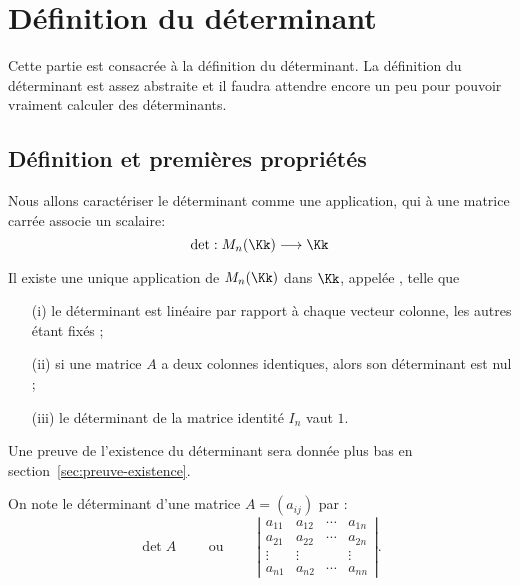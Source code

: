 \documentclass[class=report,crop=false]{standalone}
\begin{document}
\section{Définition du déterminant}

Cette partie est consacrée à la définition du déterminant.
La définition du déterminant est assez abstraite et il faudra attendre encore un peu
pour pouvoir vraiment calculer des déterminants.

\subsection{Définition et premières propriétés}


Nous allons caractériser le déterminant comme une application,
qui à une matrice carrée associe un scalaire:
$$\det : M_n(\Kk) \longrightarrow \Kk$$

\begin{theoreme}
\label{th:def:determinant}
Il existe une unique application de $M_n(\Kk)$ dans $\Kk$,
appelée , telle que
\begin{itemize}
  \item[(i)] le déterminant est linéaire par rapport à chaque
vecteur colonne, les autres étant fixés ;
  \item[(ii)] si une matrice $A$ a deux colonnes identiques,
alors son déterminant est nul ;
  \item[(iii)] le déterminant de la matrice identité $I_n$ vaut $1$.
\end{itemize}
\end{theoreme}

Une preuve de l'existence du déterminant sera donnée plus bas en section~\ref{sec:preuve-existence}.

On note le  déterminant d'une matrice $A = (a_{ij})$ par :
$$
\det A \qquad \text{ ou } \qquad
\left|\begin{array}{cccc}
a_{11} & a_{12} & \cdots & a_{1n} \\
a_{21} & a_{22} & \cdots & a_{2n} \\
\vdots & \vdots &  & \vdots \\
a_{n1} & a_{n2} & \cdots & a_{nn}
\end{array}\right|.$$
\end{document}
